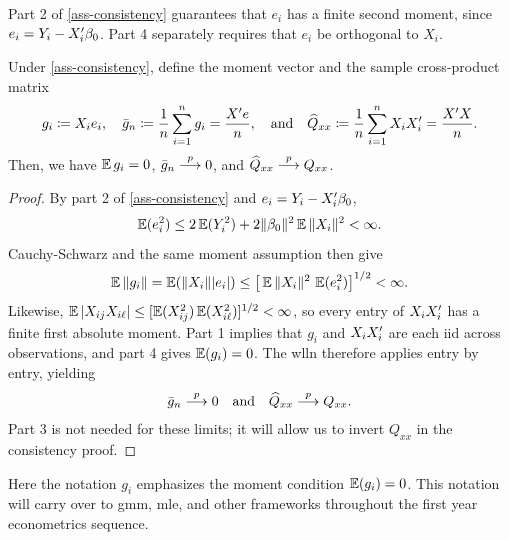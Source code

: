 \documentclass[a4paper,12pt]{article}
\begin{document}
\begin{remark}
	Part 2 of \autoref{ass-consistency} guarantees that $e_i$ has a finite second moment,
	since $e_i=Y_i-X_i^{\prime}\beta_0$.
	Part 4 separately requires that $e_i$ be orthogonal to $X_i$.
\end{remark}

\begin{lemma}\label{lem-sample-moments}
	Under \autoref{ass-consistency}, define the moment vector and the sample cross-product matrix
	\begin{align}\label{eq-sample-moments}
		g_i\coloneqq X_ie_i,\quad
		\bar g_n\coloneqq\frac1n\sum_{i=1}^ng_i=\frac{X^{\prime} e}{n},
		\quad\text{and}\quad
		\widehat Q_{xx}\coloneqq\frac1n\sum_{i=1}^nX_iX_i^{\prime}=\frac{X^{\prime} X}{n}.
	\end{align}
	Then, we have $\operatorname{\mathbb{E}} g_i=0$, $\bar g_n\overset{p}{\longrightarrow}0$, and $\widehat Q_{xx}\overset{p}{\longrightarrow} Q_{xx}$.
\end{lemma}
\begin{proof}
	By part 2 of \autoref{ass-consistency} and $e_i=Y_i-X_i^{\prime}\beta_0$,
	\begin{align*}
		\operatorname{\mathbb{E}}(e_i^2)\le2\operatorname{\mathbb{E}}(Y_i^2)+2\|\beta_0\|^2\operatorname{\mathbb{E}}\|X_i\|^2<\infty.
	\end{align*}
	Cauchy-Schwarz and the same moment assumption then give
	\begin{align*}
		\operatorname{\mathbb{E}}\|g_i\|
		=\operatorname{\mathbb{E}}(\|X_i\||e_i|)
		\le\big[\operatorname{\mathbb{E}}\|X_i\|^2\,\operatorname{\mathbb{E}}(e_i^2)\big]^{1/2}<\infty.
	\end{align*}
	Likewise, $\operatorname{\mathbb{E}}|X_{ij}X_{i\ell}|\le[\operatorname{\mathbb{E}}(X_{ij}^2)\operatorname{\mathbb{E}}(X_{i\ell}^2)]^{1/2}<\infty$,
	so every entry of $X_iX_i^{\prime}$ has a finite first absolute moment.
	Part 1 implies that $g_i$ and $X_iX_i^{\prime}$ are each \gls{iid} across observations,
	and part 4 gives $\operatorname{\mathbb{E}}(g_i)=0$.
	The \gls{wlln} therefore applies entry by entry, yielding
	\begin{align}\label{eq-moment-limits}
		\bar g_n\overset{p}{\longrightarrow}0
		\quad\text{and}\quad
		\widehat Q_{xx}\overset{p}{\longrightarrow} Q_{xx}.
	\end{align}
	Part 3 is not needed for these limits; it will allow us to invert $Q_{xx}$ in the consistency proof.
\end{proof}

\begin{remark}[Notation $g_i$]
	Here the notation $g_i$ emphasizes the moment condition $\operatorname{\mathbb{E}}(g_i)=0$.
	This notation will carry over to \gls{gmm}, \gls{mle}, and other frameworks throughout the first year econometrics sequence. 
\end{remark}
\end{document}
